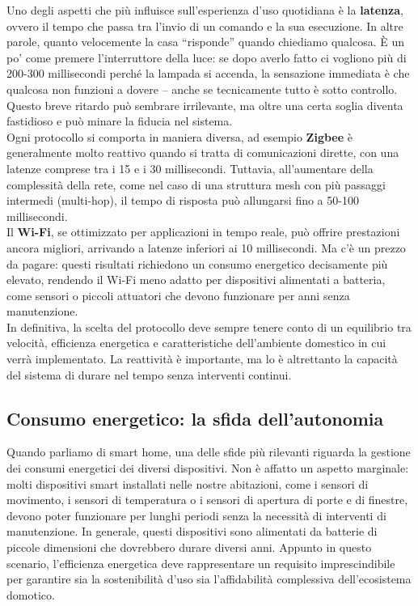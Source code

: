 Uno degli aspetti che più influisce sull’esperienza d’uso quotidiana è la \textbf{latenza}, ovvero il tempo che passa tra l’invio di un comando e la sua esecuzione. In altre parole, quanto velocemente la casa “risponde” quando chiediamo qualcosa. È un po’ come premere l’interruttore della luce: se dopo averlo fatto ci vogliono più di 200-300 millisecondi perché la lampada si accenda, la sensazione immediata è che qualcosa non funzioni a dovere – anche se tecnicamente tutto è sotto controllo. Questo breve ritardo può sembrare irrilevante, ma oltre una certa soglia diventa fastidioso e può minare la fiducia nel sistema.\\

Ogni protocollo si comporta in maniera diversa, ad esempio \textbf{Zigbee} è generalmente molto reattivo quando si tratta di comunicazioni dirette, con una latenze comprese tra i 15 e i 30 millisecondi. Tuttavia, all'aumentare della complessità  della rete, come nel caso di una struttura mesh con più passaggi intermedi (multi-hop), il tempo di risposta può allungarsi fino a 50-100 millisecondi.\\

Il \textbf{Wi-Fi}, se ottimizzato per applicazioni in tempo reale, può offrire prestazioni ancora migliori, arrivando a latenze inferiori ai 10 millisecondi. Ma c’è un prezzo da pagare: questi risultati richiedono un consumo energetico decisamente più elevato, rendendo il Wi-Fi meno adatto per dispositivi alimentati a batteria, come sensori o piccoli attuatori che devono funzionare per anni senza manutenzione.\\

In definitiva, la scelta del protocollo deve sempre tenere conto di un equilibrio tra velocità, efficienza energetica e caratteristiche dell’ambiente domestico in cui verrà implementato. La reattività è importante, ma lo è altrettanto la capacità del sistema di durare nel tempo senza interventi continui.


\subsection{Consumo energetico: la sfida dell’autonomia}

Quando parliamo di smart home, una delle sfide più rilevanti riguarda la gestione dei consumi energetici dei diversi dispositivi. Non è affatto un aspetto marginale: molti dispositivi smart installati nelle nostre abitazioni, come i sensori di movimento, i sensori di temperatura o i sensori di apertura di porte e di finestre, devono poter funzionare per lunghi periodi senza la necessità di interventi di manutenzione. In generale, questi dispositivi sono alimentati da batterie di piccole dimensioni che dovrebbero durare diversi anni. Appunto in questo scenario, l’efficienza energetica deve rappresentare un requisito imprescindibile per garantire sia la sostenibilità d’uso sia l’affidabilità complessiva dell’ecosistema domotico.


